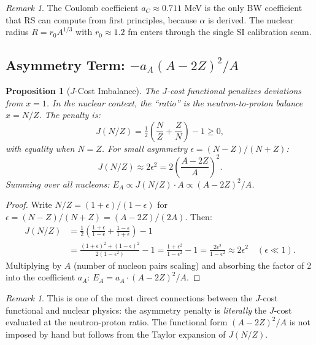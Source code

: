 \documentclass[12pt,a4paper]{article}
\newtheorem{proposition}[theorem]{Proposition}
\theoremstyle{definition}
\theoremstyle{remark}
\newtheorem{remark}[theorem]{Remark}
\begin{document}
\begin{remark}
The Coulomb coefficient $a_C \approx 0.711$ MeV is the only
BW coefficient that RS can compute from first principles,
because $\alpha$ is derived.  The nuclear radius
$R = r_0 A^{1/3}$ with $r_0 \approx 1.2$ fm enters through
the single SI calibration seam.
\end{remark}

\subsection{Asymmetry Term: $-a_A (A-2Z)^2/A$}

\begin{proposition}[$J$-Cost Imbalance]
\label{prop:asymmetry}
The $J$-cost functional penalizes deviations from $x = 1$.
In the nuclear context, the ``ratio'' is the neutron-to-proton
balance $x = N/Z$.  The penalty is:
\begin{equation}
  J(N/Z) = \tfrac{1}{2}\!\left(\frac{N}{Z} + \frac{Z}{N}\right)
  - 1 \geq 0,
\end{equation}
with equality when $N = Z$.  For small asymmetry
$\epsilon = (N-Z)/(N+Z)$:
\begin{equation}
  J(N/Z) \approx 2\epsilon^2 = 2\left(\frac{A - 2Z}{A}\right)^2.
  \label{eq:j-asym}
\end{equation}
Summing over all nucleons:
$E_A \propto J(N/Z) \cdot A \propto (A-2Z)^2/A$.
\end{proposition}

\begin{proof}
Write $N/Z = (1+\epsilon)/(1-\epsilon)$ for
$\epsilon = (N-Z)/(N+Z) = (A-2Z)/(2A)$.  Then:
\begin{align}
  J(N/Z) &= \tfrac{1}{2}\!\left(\frac{1+\epsilon}{1-\epsilon}
  + \frac{1-\epsilon}{1+\epsilon}\right) - 1 \nonumber \\
  &= \frac{(1+\epsilon)^2 + (1-\epsilon)^2}{2(1-\epsilon^2)} - 1
  = \frac{1+\epsilon^2}{1-\epsilon^2} - 1
  = \frac{2\epsilon^2}{1-\epsilon^2}
  \approx 2\epsilon^2 \quad (\epsilon \ll 1).
\end{align}
Multiplying by $A$ (number of nucleon pairs scaling) and
absorbing the factor of 2 into the coefficient $a_A$:
$E_A = a_A \cdot (A-2Z)^2 / A$.
\end{proof}

\begin{remark}
This is one of the most direct connections between the $J$-cost
functional and nuclear physics: the asymmetry penalty is
\emph{literally} the $J$-cost evaluated at the neutron-proton
ratio.  The functional form $(A-2Z)^2/A$ is not imposed by
hand but follows from the Taylor expansion of $J(N/Z)$.
\end{remark}
\end{document}
